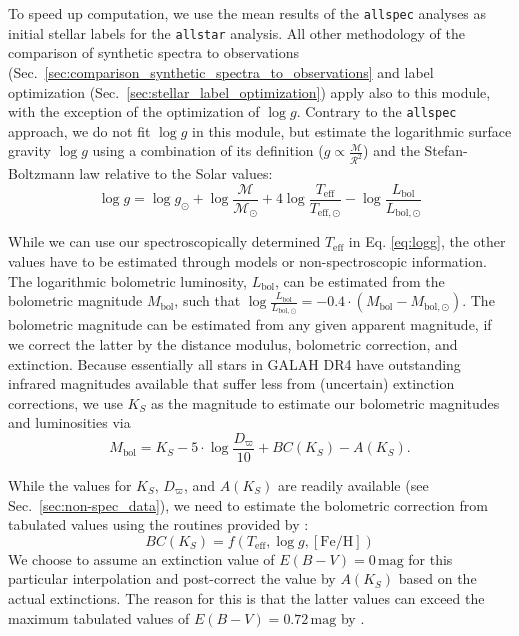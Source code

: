 \documentclass[
  journal=pasa,
  manuscript=research-paper, %
  year=2024,
  volume=37
]{cup-journal}
\newcommand{\logg}{$\log g$\xspace}
\begin{document}
To speed up computation, we use the mean results of the \texttt{allspec} analyses as initial stellar labels for the \texttt{allstar} analysis. All other methodology of the comparison of synthetic spectra to observations (Sec.~\ref{sec:comparison_synthetic_spectra_to_observations} and label optimization (Sec.~\ref{sec:stellar_label_optimization}) apply also to this module, with the exception of the optimization of \logg. Contrary to the \texttt{allspec} approach, we do not fit \logg in this module, but estimate the logarithmic surface gravity $\log g$ using a combination of its definition ($g \propto \frac{\mathcal{M}}{\mathcal{R}^2}$) and the Stefan-Boltzmann law relative to the Solar values:
\begin{equation}
\log g = \log g_\odot + \log \frac{\mathcal{M}}{\mathcal{M_\odot}} + 4 \log \frac{T_\mathrm{eff}}{T_\mathrm{eff,\odot}} - \log \frac{L_\mathrm{bol}}{L_\mathrm{bol,\odot}} \label{eq:logg}
\end{equation}

While we can use our spectroscopically determined $T_\mathrm{eff}$ in Eq. \ref{eq:logg}, the other values have to be estimated through models or non-spectroscopic information. The logarithmic bolometric luminosity, $L_\mathrm{bol}$, can be estimated from the bolometric magnitude $M_\mathrm{bol}$, such that $\log \frac{L_\mathrm{bol}}{L_\mathrm{bol,\odot}} = -0.4 \cdot \left(M_\mathrm{bol} - M_\mathrm{bol,\odot} \right)$. The bolometric magnitude can be estimated from any given apparent magnitude, if we correct the latter by the distance modulus, bolometric correction, and extinction. Because essentially all stars in GALAH DR4 have outstanding infrared magnitudes available that suffer less from (uncertain) extinction corrections, we use $K_S$ as the magnitude to estimate our bolometric magnitudes and luminosities via
\begin{equation}
M_\mathrm{bol} = K_S - 5\cdot \log \frac{D_\varpi}{10} + BC(K_S) - A(K_S). \label{eq:mbol}
\end{equation}

While the values for $K_S$, $D_\varpi$, and $A(K_S)$ are readily available (see Sec.~\ref{sec:non-spec_data}), we need to estimate the bolometric correction from tabulated values using the routines provided by \citet{Casagrande2018}:
\begin{equation}
BC(K_S) = f(T_\mathrm{eff}, \log g, \mathrm{[Fe/H]})
\label{eq:bc_ks}
\end{equation}
We choose to assume an extinction value of $E(B-V) = 0\,\mathrm{mag}$ for this particular interpolation and post-correct the value by $A(K_S)$ based on the actual extinctions. The reason for this is that the latter values can exceed the maximum tabulated values of $E(B-V) = 0.72\,\mathrm{mag}$ by \citet{Casagrande2018}.
\end{document}
